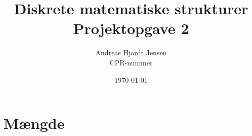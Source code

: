 \documentclass{article}
\title{Diskrete matematiske strukturer\\ 
          Projektopgave 2}
\author{
          Andreas Hjordt Jensen \\
          CPR-nummer\\
}
\date{\today}
\begin{document}
\maketitle
\clearpage
\section{M{\ae}ngde}
\end{document}
